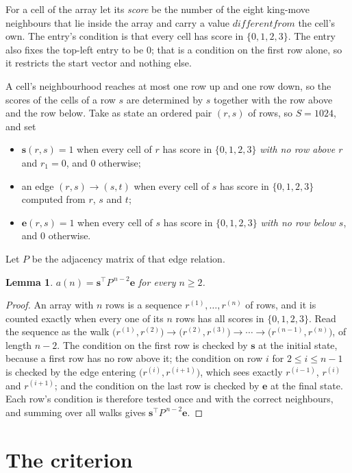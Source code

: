 \documentclass[11pt,a4paper]{article}
\theoremstyle{plain}
\newtheorem{lemma}[theorem]{Lemma}
\theoremstyle{definition}
\begin{document}
For a cell of the array let its \emph{score} be the number of the eight king-move neighbours that lie inside
the array and carry a value $different from$ the cell's own. The entry's condition is that every cell
has score in $\{0,1,2,3\}$. The entry also fixes the top-left entry to be $0$; that is a condition on the first row alone, so it restricts the start vector and nothing else.

A cell's neighbourhood reaches at most one row up and one row down, so the scores of the
cells of a row $s$ are determined by $s$ together with the row above and the row below.
Take as state an ordered pair $(r,s)$ of rows, so $S=1024$, and set
\begin{itemize}
\item $\mathbf{s}(r,s)=1$ when every cell of $r$ has score in $\{0,1,2,3\}$ \emph{with no row
above $r$} and $r_1=0$, and $0$ otherwise;
\item an edge $(r,s)\to(s,t)$ when every cell of $s$ has score in $\{0,1,2,3\}$ computed from
$r$, $s$ and $t$;
\item $\mathbf{e}(r,s)=1$ when every cell of $s$ has score in $\{0,1,2,3\}$ \emph{with no row
below $s$}, and $0$ otherwise.
\end{itemize}
Let $P$ be the adjacency matrix of that edge relation.

\begin{lemma}\label{lem:walk}
$a(n)=\mathbf{s}^{\!\top}P^{\,n-2}\mathbf{e}$ for every $n\ge2$.
\end{lemma}

\begin{proof}
An array with $n$ rows is a sequence $r^{(1)},\dots,r^{(n)}$ of rows, and it is counted
exactly when every one of its $n$ rows has all scores in $\{0,1,2,3\}$. Read the sequence as the
walk $\bigl(r^{(1)},r^{(2)}\bigr)\to\bigl(r^{(2)},r^{(3)}\bigr)\to\cdots\to
\bigl(r^{(n-1)},r^{(n)}\bigr)$, of length $n-2$. The condition on the first row is
checked by $\mathbf{s}$ at the initial state, because a first row has no row above it; the
condition on row $i$ for $2\le i\le n-1$ is checked by the edge entering
$\bigl(r^{(i)},r^{(i+1)}\bigr)$, which sees exactly $r^{(i-1)}$, $r^{(i)}$ and
$r^{(i+1)}$; and the condition on the last row is checked by $\mathbf{e}$ at the final
state. Each row's condition is therefore tested once and with the correct neighbours, and
summing over all walks gives $\mathbf{s}^{\!\top}P^{\,n-2}\mathbf{e}$.
\end{proof}

\section{The criterion}
\end{document}
